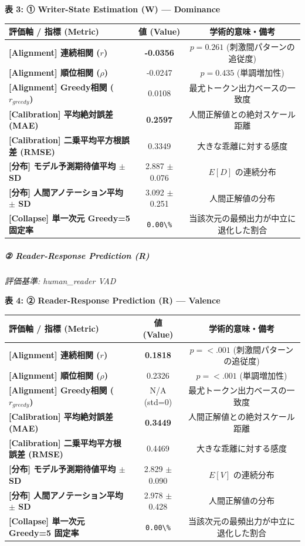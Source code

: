 \textbf{表 3: ① Writer-State Estimation (W) — Dominance}
\begin{center}
\small
\begin{tabular}{lcc}
\toprule
\textbf{評価軸 / 指標 (Metric)} & \textbf{値 (Value)} & \textbf{学術的意味・備考} \\
\midrule
\textbf{[Alignment] 連続相関 ($r$)} & \textbf{-0.0356} & $p = 0.261 $ (刺激間パターンの追従度) \\
\textbf{[Alignment] 順位相関 ($\rho$)} & -0.0247 & $p = 0.435 $ (単調増加性) \\
\textbf{[Alignment] Greedy相関 ($r_{greedy}$)} & 0.0108 & 最尤トークン出力ベースの一致度 \\
\textbf{[Calibration] 平均絶対誤差 (MAE)} & \textbf{0.2597} & 人間正解値との絶対スケール距離 \\
\textbf{[Calibration] 二乗平均平方根誤差 (RMSE)} & 0.3349 & 大きな乖離に対する感度 \\
\textbf{[分布] モデル予測期待値平均 $\pm$ SD} & 2.887 $\pm$ 0.076 & $E[D]$ の連続分布 \\
\textbf{[分布] 人間アノテーション平均 $\pm$ SD} & 3.092 $\pm$ 0.251 & 人間正解値の分布 \\
\textbf{[Collapse] 単一次元 Greedy=5 固定率} & \texttt{0.00\textbackslash{}\%} & 当該次元の最頻出力が中立に退化した割合 \\
\bottomrule
\end{tabular}
\end{center}


\subparagraph{② Reader-Response Prediction (R)}
\textit{評価基準: human\_reader VAD}

\textbf{表 4: ② Reader-Response Prediction (R) — Valence}
\begin{center}
\small
\begin{tabular}{lcc}
\toprule
\textbf{評価軸 / 指標 (Metric)} & \textbf{値 (Value)} & \textbf{学術的意味・備考} \\
\midrule
\textbf{[Alignment] 連続相関 ($r$)} & \textbf{0.1818} & $p = <.001 $ (刺激間パターンの追従度) \\
\textbf{[Alignment] 順位相関 ($\rho$)} & 0.2326 & $p = <.001 $ (単調増加性) \\
\textbf{[Alignment] Greedy相関 ($r_{greedy}$)} & N/A (std=0) & 最尤トークン出力ベースの一致度 \\
\textbf{[Calibration] 平均絶対誤差 (MAE)} & \textbf{0.3449} & 人間正解値との絶対スケール距離 \\
\textbf{[Calibration] 二乗平均平方根誤差 (RMSE)} & 0.4469 & 大きな乖離に対する感度 \\
\textbf{[分布] モデル予測期待値平均 $\pm$ SD} & 2.829 $\pm$ 0.090 & $E[V]$ の連続分布 \\
\textbf{[分布] 人間アノテーション平均 $\pm$ SD} & 2.978 $\pm$ 0.428 & 人間正解値の分布 \\
\textbf{[Collapse] 単一次元 Greedy=5 固定率} & \texttt{0.00\textbackslash{}\%} & 当該次元の最頻出力が中立に退化した割合 \\
\bottomrule
\end{tabular}
\end{center}


